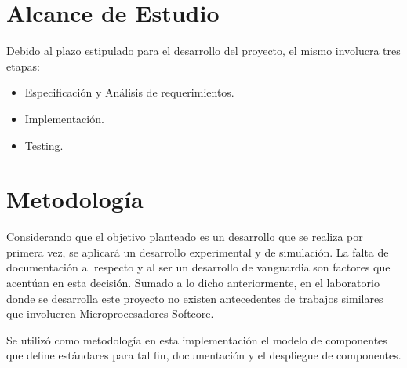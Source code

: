 \section{Alcance de Estudio}
Debido al plazo estipulado para el desarrollo del proyecto, el mismo involucra tres etapas: 

\begin {itemize}
\item Especificación y Análisis de requerimientos.
\item Implementación.
\item Testing.
\end {itemize}


\section{Metodología}
Considerando que el objetivo planteado es un desarrollo que se realiza por primera vez, se aplicará un desarrollo experimental y de simulación. La
falta de documentación al respecto y al ser un desarrollo de vanguardia son factores que acentúan en esta decisión. Sumado a lo dicho anteriormente,
en el laboratorio donde se desarrolla este proyecto no existen antecedentes de trabajos similares que involucren Microprocesadores Softcore.


Se utilizó como metodología en esta implementación el modelo de componentes que define estándares para tal fin, documentación y el
despliegue de componentes.







